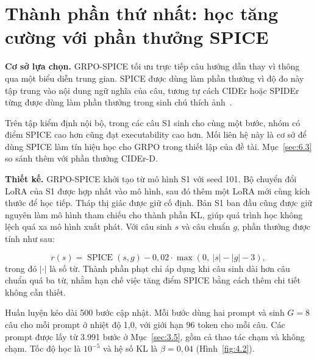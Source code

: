 \section{Thành phần thứ nhất: học tăng cường với phần thưởng SPICE}\label{sec:4.5}

\textbf{Cơ sở lựa chọn.} GRPO-SPICE tối ưu trực tiếp câu hướng dẫn thay vì thông qua một biểu diễn trung gian. SPICE được dùng làm phần thưởng vì độ đo này tập trung vào nội dung ngữ nghĩa của câu, tương tự cách CIDEr hoặc SPIDEr từng được dùng làm phần thưởng trong sinh chú thích ảnh~\cite{scst,spider}.

Trên tập kiểm định nội bộ, trong các câu S1 sinh cho cùng một bước, nhóm có điểm SPICE cao hơn cũng đạt executability cao hơn. Mối liên hệ này là cơ sở để dùng SPICE làm tín hiệu học cho GRPO trong thiết lập của đề tài. Mục~\ref{sec:6.3} so sánh thêm với phần thưởng CIDEr-D.

\textbf{Thiết kế.} GRPO-SPICE khởi tạo từ mô hình S1 với seed 101. Bộ chuyển đổi LoRA của S1 được hợp nhất vào mô hình, sau đó thêm một LoRA mới cùng kích thước để học tiếp. Tháp thị giác được giữ cố định. Bản S1 ban đầu cũng được giữ nguyên làm mô hình tham chiếu cho thành phần KL, giúp quá trình học không lệch quá xa mô hình xuất phát. Với câu sinh $s$ và câu chuẩn $g$, phần thưởng được tính như sau:

\begin{equation}
r(s) = \operatorname{SPICE}(s,g) - 0{,}02 \cdot \max(0,\ |s|-|g|-3),
\label{eq:4.1}
\end{equation}
\noindent
trong đó $|\cdot|$ là số từ. Thành phần phạt chỉ áp dụng khi câu sinh dài hơn câu chuẩn quá ba từ, nhằm hạn chế việc tăng điểm SPICE bằng cách thêm chi tiết không cần thiết.

Huấn luyện kéo dài 500 bước cập nhật. Mỗi bước dùng hai prompt và sinh $G = 8$ câu cho mỗi prompt ở nhiệt độ 1,0, với giới hạn 96 token cho mỗi câu. Các prompt được lấy từ 3.991 bước ở Mục~\ref{sec:3.5}, gồm cả thao tác chạm và không chạm. Tốc độ học là $10^{-5}$ và hệ số KL là $\beta = 0{,}04$ (Hình~\ref{fig:4.2}).

